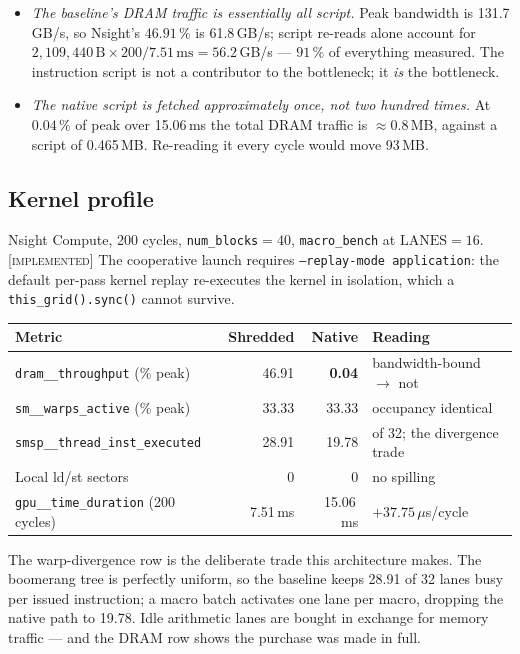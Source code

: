 \documentclass[11pt]{article}
\newcommand{\I}{\textcolor{note}{\scriptsize\textsc{[implemented]}}}
\newcommand{\code}[1]{\texttt{\small #1}}
\begin{document}
\begin{itemize}
\item \emph{The baseline's DRAM traffic is essentially all script.} Peak bandwidth is
131.7\,GB/s, so Nsight's $46.91\,\%$ is 61.8\,GB/s; script re-reads alone account for
$2{,}109{,}440\,\mathrm{B} \times 200 / 7.51\,\mathrm{ms} = 56.2$\,GB/s --- $91\,\%$ of
everything measured. The instruction script is not a contributor to the bottleneck;
it \emph{is} the bottleneck.
\item \emph{The native script is fetched approximately once, not two hundred times.}
At $0.04\,\%$ of peak over 15.06\,ms the total DRAM traffic is $\approx 0.8$\,MB,
against a script of 0.465\,MB. Re-reading it every cycle would move 93\,MB.
\end{itemize}

\subsection{Kernel profile}

Nsight Compute, 200 cycles, \code{num\_blocks}$=40$, \code{macro\_bench} at
$\mathrm{LANES}=16$. \I{} The cooperative launch requires
\code{--replay-mode application}: the default per-pass kernel replay re-executes the
kernel in isolation, which a \code{this\_grid().sync()} cannot survive.

\begin{center}\small
\begin{tabular}{lrrl}
\toprule
Metric & Shredded & Native & Reading\\
\midrule
\code{dram\_\_throughput} (\% peak)        & 46.91 & \textbf{0.04} & bandwidth-bound $\to$ not\\
\code{sm\_\_warps\_active} (\% peak)       & 33.33 & 33.33 & occupancy identical\\
\code{smsp\_\_thread\_inst\_executed}      & 28.91 & 19.78 & of 32; the divergence trade\\
Local ld/st sectors                        & 0 & 0 & no spilling\\
\code{gpu\_\_time\_duration} (200 cycles)  & 7.51\,ms & 15.06\,ms & $+37.75\,\mu$s/cycle\\
\bottomrule
\end{tabular}
\end{center}

The warp-divergence row is the deliberate trade this architecture makes. The
boomerang tree is perfectly uniform, so the baseline keeps 28.91 of 32 lanes busy per
issued instruction; a macro batch activates one lane per macro, dropping the native
path to 19.78. Idle arithmetic lanes are bought in exchange for memory traffic --- and
the DRAM row shows the purchase was made in full.
\end{document}
